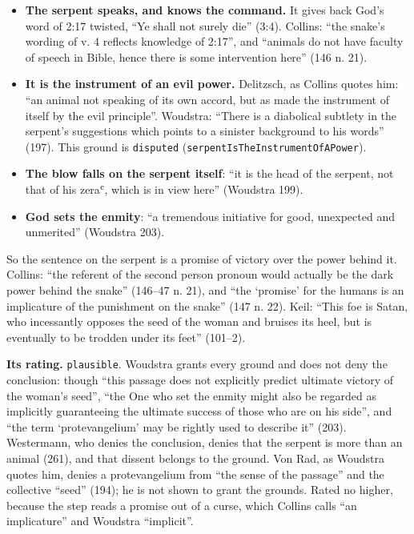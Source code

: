 \documentclass[11pt]{article}
\begin{document}
\begin{itemize}
  \item \textbf{The serpent speaks, and knows the command.} It gives back God’s word of 2:17 twisted, “Ye shall not surely die” (3:4). Collins: “the snake’s wording of v. 4 reflects knowledge of 2:17”, and “animals do not have faculty of speech in Bible, hence there is some intervention here” (146 n. 21).
  \item \textbf{It is the instrument of an evil power.} Delitzsch, as Collins quotes him: “an animal not speaking of its own accord, but as made the instrument of itself by the evil principle”. Woudstra: “There is a diabolical subtlety in the serpent’s suggestions which points to a sinister background to his words” (197). This ground is \texttt{disputed} (\texttt{serpent\allowbreak{}Is\allowbreak{}The\allowbreak{}Instrument\allowbreak{}Of\allowbreak{}APower}).
  \item \textbf{The blow falls on the serpent itself}: “it is the head of the serpent, not that of his zeraʿ, which is in view here” (Woudstra 199).
  \item \textbf{God sets the enmity}: “a tremendous initiative for good, unexpected and unmerited” (Woudstra 203).
\end{itemize}
So the sentence on the serpent is a promise of victory over the power behind it. Collins: “the referent of the second person pronoun would actually be the dark power behind the snake” (146–47 n. 21), and “the ‘promise’ for the humans is an implicature of the punishment on the snake” (147 n. 22). Keil: “This foe is Satan, who incessantly opposes the seed of the woman and bruises its heel, but is eventually to be trodden under its feet” (101–2).

\textbf{Its rating.} \texttt{plausible}. Woudstra grants every ground and does not deny the conclusion: though “this passage does not explicitly predict ultimate victory of the woman’s seed”, “the One who set the enmity might also be regarded as implicitly guaranteeing the ultimate success of those who are on his side”, and “the term ‘protevangelium’ may be rightly used to describe it” (203). Westermann, who denies the conclusion, denies that the serpent is more than an animal (261), and that dissent belongs to the ground. Von Rad, as Woudstra quotes him, denies a protevangelium from “the sense of the passage” and the collective “seed” (194); he is not shown to grant the grounds. Rated no higher, because the step reads a promise out of a curse, which Collins calls “an implicature” and Woudstra “implicit”.
\end{document}
